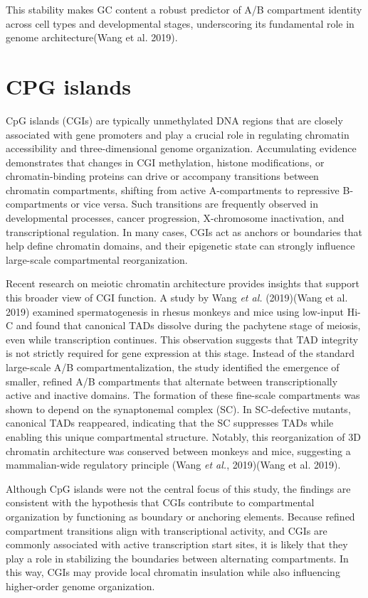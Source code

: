 \documentclass[
  a4paper,
  openany]{scrbook}
\begin{document}
This stability makes GC content a robust predictor of A/B compartment
identity across cell types and developmental stages, underscoring its
fundamental role in genome architecture(Wang et al. 2019).

\section{CPG islands}\label{cpg-islands}

CpG islands (CGIs) are typically unmethylated DNA regions that are
closely associated with gene promoters and play a crucial role in
regulating chromatin accessibility and three-dimensional genome
organization. Accumulating evidence demonstrates that changes in CGI
methylation, histone modifications, or chromatin-binding proteins can
drive or accompany transitions between chromatin compartments, shifting
from active A-compartments to repressive B-compartments or vice versa.
Such transitions are frequently observed in developmental processes,
cancer progression, X-chromosome inactivation, and transcriptional
regulation. In many cases, CGIs act as anchors or boundaries that help
define chromatin domains, and their epigenetic state can strongly
influence large-scale compartmental reorganization.

Recent research on meiotic chromatin architecture provides insights that
support this broader view of CGI function. A study by Wang \emph{et al.}
(2019)(Wang et al. 2019) examined spermatogenesis in rhesus monkeys and
mice using low-input Hi-C and found that canonical TADs dissolve during
the pachytene stage of meiosis, even while transcription continues. This
observation suggests that TAD integrity is not strictly required for
gene expression at this stage. Instead of the standard large-scale A/B
compartmentalization, the study identified the emergence of smaller,
refined A/B compartments that alternate between transcriptionally active
and inactive domains. The formation of these fine-scale compartments was
shown to depend on the synaptonemal complex (SC). In SC-defective
mutants, canonical TADs reappeared, indicating that the SC suppresses
TADs while enabling this unique compartmental structure. Notably, this
reorganization of 3D chromatin architecture was conserved between
monkeys and mice, suggesting a mammalian-wide regulatory principle (Wang
\emph{et al.}, 2019)(Wang et al. 2019).

Although CpG islands were not the central focus of this study, the
findings are consistent with the hypothesis that CGIs contribute to
compartmental organization by functioning as boundary or anchoring
elements. Because refined compartment transitions align with
transcriptional activity, and CGIs are commonly associated with active
transcription start sites, it is likely that they play a role in
stabilizing the boundaries between alternating compartments. In this
way, CGIs may provide local chromatin insulation while also influencing
higher-order genome organization.
\end{document}
